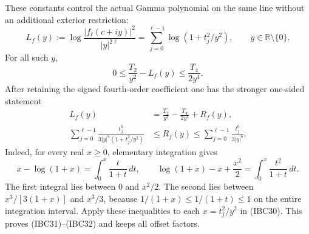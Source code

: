 These constants control the actual Gamma polynomial on the same line
without an additional exterior restriction:
\[
 L_f(y):=\log\frac{|f_\ell(c+iy)|^2}{|y|^{2\ell}}
       =\sum_{j=0}^{\ell-1}\log(1+t_j^2/y^2),
       \qquad y\in\mathbb R\setminus\{0\}.
 \tag{IBC30}
\]
For all such \(y\),
\[
 0\leq \frac{T_2}{y^2}-L_f(y)\leq\frac{T_4}{2y^4}.
 \tag{IBC31}
\]
After retaining the signed fourth-order coefficient one has the
stronger one-sided statement
\[
 \begin{split}
 L_f(y)&=\frac{T_2}{y^2}-\frac{T_4}{2y^4}+R_f(y),\\
 \sum_{j=0}^{\ell-1}
       \frac{t_j^6}{3|y|^6(1+t_j^2/y^2)}
   &\leq R_f(y)\leq
       \sum_{j=0}^{\ell-1}\frac{t_j^6}{3|y|^6}.
 \end{split}
 \tag{IBC32}
\]
Indeed, for every real \(x\geq0\), elementary integration gives
\[
 x-\log(1+x)=\int_0^x\frac{t}{1+t}\,dt,\qquad
 \log(1+x)-x+\frac{x^2}{2}
       =\int_0^x\frac{t^2}{1+t}\,dt.
 \tag{IBC33}
\]
The first integral lies between \(0\) and \(x^2/2\).
The second lies between \(x^3/[3(1+x)]\) and \(x^3/3\), because
\(1/(1+x)\leq1/(1+t)\leq1\) on the entire integration interval.
Apply these inequalities to each \(x=t_j^2/y^2\) in (IBC30).
This proves (IBC31)--(IBC32) and keeps all offset factors.

